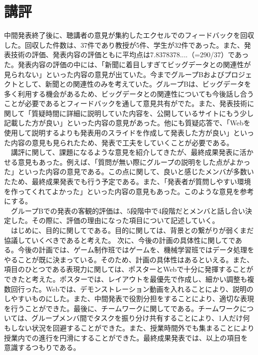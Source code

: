 \section{講評}
中間発表終了後に、聴講者の意見が集約したエクセルでのフィードバックを回収した。回収した件数は、37件であり教授が5件、学生が32件であった。また、発表技術の評価、発表内容の評価ともに平均点は7.8378378....（=290/37）であった。発表内容の評価の中には、「新聞に着目しすぎてビッグデータとの関連性が見られない」といった内容の意見が出ていた。今までグループBおよびプロジェクトとして、新聞との関連性のみを考えていた。グループBは、ビッグデータを多く利用する機会があるため、ビッグデータとの関連性についても今後話し合うことが必要であるとフィードバックを通して意見共有がでた。また、発表技術に関して「質疑時間に詳細に説明していた内容を、公開しているサイトにもう少し記載した方が良い」といった内容の意見があった。他にも質疑応答で、「Webを使用して説明するよりも発表用のスライドを作成して発表した方が良い」といった内容の意見も見られたため、発表で工夫をしていくことが必要である。\\
　講評に関して、課題になるような意見を紹介してきたが、最終成果発表に活かせる意見もあった。例えば、「質問が無い際にグループの説明をした点がよかった」といった内容の意見である。この点に関して、良いと感じたメンバが多数いたため、最終成果発表でも行う予定である。また、「発表者が質問しやすい環境を作ってくれてよかった」といった内容の意見もあった。このような意見を参考にする。\\
　グループBでの発表の客観的評価は、5段階中で4段階だとメンバと話し合い決定した。その際に、評価の理由になった項目について記述していく。\\
　はじめに、目的に関してである。目的に関しては、背景との繋がりが弱くまだ協議していくべきであると考えた。 次に、今後の計画の具体性に関してである。今後の計画では、ゲーム制作班ではゲームを、機械学習班ではデータ処理をやることが既に決まっている。そのため、計画の具体性はあるといえる。また、項目のひとつである表現力に関しては、ポスターとWebで十分に発揮することができたと考えた。ポスターでは、レイアウトを最優先で作成し、細かい調整も複数回行った。Webでは、デモンストレーション動画を入れることにより、説明のしやすいものにした。また、中間発表で役割分担をすることにより、適切な表現を行うことができた。最後に、チームワークに関してである。チームワークについては、グループメンバ間でタスクを振り分け共有することにより、1人だけ何もしない状況を回避することができた。また、授業時間外でも集まることにより授業内での進行を円滑にすることができた。最終成果発表では、以上の項目を意識するつもりである。
